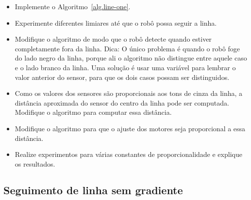 \begin{framed}
\begin{itemize}
\item Implemente o Algoritmo~\ref{alg.line-one}.
\item Experimente diferentes limiares até que o robô possa seguir a linha.
\item Modifique o algoritmo de modo que o robô detecte quando estiver completamente fora da linha. Dica: O único problema é quando o robô foge do lado negro da linha, porque ali o algoritmo não distingue entre aquele caso e o lado branco da linha. Uma solução é usar uma variável para lembrar o valor anterior do sensor, para que os dois casos possam ser distinguidos.
\end{itemize}
\end{framed}

\begin{framed}
\begin{itemize}
\item Como os valores dos sensores são proporcionais aos tons de cinza da linha, a distância aproximada do sensor do centro da linha pode ser computada. Modifique o algoritmo para computar essa distância.
\item Modifique o algoritmo para que o ajuste dos motores seja proporcional a essa distância.
\item Realize experimentos para várias constantes de proporcionalidade e explique os resultados.
\end{itemize}
\end{framed}

\subsection{Seguimento de linha sem gradiente}\label{s.no-gradient}

